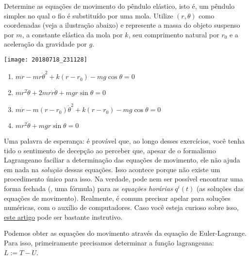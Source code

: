 \begin{question}
    Determine as equações de movimento do pêndulo elástico, isto é, um pêndulo simples no qual o fio é substituído por uma mola.
    Utilize $(r, \theta)$ como coordenadas (veja a ilustração abaixo) e represente a massa do objeto suspenso por $m$, a constante elástica da mola por $k$, seu comprimento natural por $r_0$ e a aceleração da gravidade por $g$.

    \begin{center}
      \texttt{[image: 20180718\_231128]}
    \end{center}

    \begin{enumerate}
      \item $m\ddot r - m r \dot \theta^2 + k(r - r_0) - mg\cos\theta = 0$ \rightanswer
      \item $mr^2\ddot\theta + 2 mr\dot r\dot \theta + mgr\sin\theta = 0$ \rightanswer
      \item $m\ddot r - m (r - r_0) \dot \theta^2 + k(r - r_0) - mg\cos\theta = 0$
      \item $mr^2\ddot\theta + mgr\sin\theta = 0$ 
    \end{enumerate}

    \bigskip
    \begin{compactdesc}
      \item[Uma palavra de esperança:] é provável que, ao longo desses exercícios, você tenha tido o sentimento de decepção ao perceber que, apesar de o formalismo Lagrangeano faciliar a determinação das equações de movimento, ele não ajuda em nada na \emph{solução} dessas equações.
      Isso acontece porque não existe um procedimento único para isso.
      Na verdade, pode nem ser possível encontrar uma forma fechada (\ie, uma fórmula) para as \emph{equações horárias} $q^i(t)$ (as soluções das equações de movimento).
      Realmente, é comum precisar apelar para soluções numéricas, com o auxílio de computadores.
      Caso você esteja curioso sobre isso, \href{http://people.duke.edu/~hpgavin/cee541/LagrangesEqns.pdf}{este artigo} pode ser bastante instrutivo.
    \end{compactdesc}

    \begin{solution}
      Podemos obter as equações do movimento através da equação de Euler-Lagrange.
      Para isso, primeiramente precisamos determinar a função lagrangeana: $L := T - U$.


\end{solution}
\end{question}
